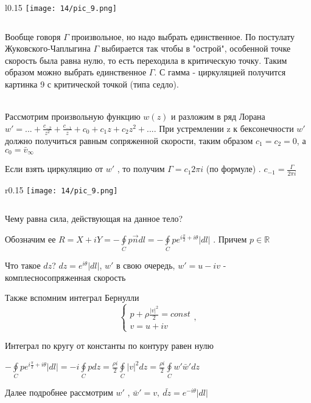 \begin{wrapfigure}{l}{0.15\textwidth}
	\texttt{[image: 14/pic\_9.png]}
	\caption{\label{ris:image14.9}}
\end{wrapfigure}
$$ $$

Вообще говоря $\Gamma$ произвольное, но надо выбрать единственное. По постулату Жуковского-Чаплыгина $\Gamma$ выбирается так чтобы в "острой", особенной точке скорость была равна нулю, то есть переходила в критическую точку. Таким образом можно выбрать единственное $\Gamma$. С гамма - циркуляцией получится картинка 9 с критической точкой (типа седло).

\newpage
\\

Рассмотрим произвольную функцию $w(z)$ и разложим в ряд Лорана $w' = ... + \frac{c_{-2}}{z^2} + \frac{c_{-1}}{z} + c_0 + c_1 z + c_2 z^2 + ... $. При устремлении z к бексонечности $w'$ должно получиться равным сопряженной скорости, таким образом $c_1 = c_2 = 0$, а $c_0 = \bar{v}_{\infty}$

Если взять циркуляцию от $w'$ , то получим $\Gamma = c_1 2 \pi i $ (по формуле) . $c_{-1} = \frac{\Gamma}{2 \pi i}$

\begin{wrapfigure}{r}{0.15\textwidth}
	\texttt{[image: 14/pic\_9.png]}
	\caption{\label{ris:image14.10}}
\end{wrapfigure}
$$ $$

Чему равна сила, действующая на данное тело? 

Обозначим ее $R = X + i Y = - 	\oint \limits_{C} p \overrightarrow{n} dl = - \oint \limits_{C} p e^{i\frac{\pi}{2} + i\theta} |dl|$ . Причем $p \in \mathbb{R}$

Что такое $dz$? $dz = e^{i \theta} |dl |$, $w'$  в свою очередь, $w' = u -i v$ -  комплесносопряженная скорость 

Также вспомним интеграл Бернулли
$$ \begin{cases}
	p + \rho \frac{|v|^2}{2} = const \\
	v = u + i v
\end{cases},$$

Интеграл по кругу от константы по контуру равен нулю 

$- \oint \limits_{C} p e^{i\frac{\pi}{2} + i\theta} |dl| = -i \oint  \limits_{C} p dz = \frac{\rho i}{2} \oint  \limits_{C} |v|^2 dz =  \frac{\rho i}{2} \oint  \limits_{C} w' \bar{w}' d z$

Далее подробнее рассмотрим $w'$ , $\bar{w}' = v, \ \bar{dz} = e^{-i \theta} |dl|$

